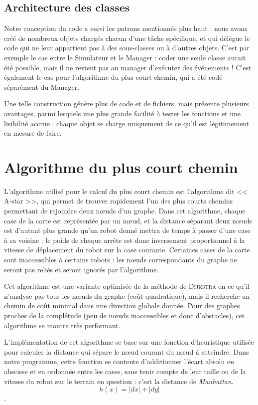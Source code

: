 \documentclass[a4paper,11pt]{article}
\begin{document}
\subsection{Architecture des classes}
Notre conception du code a suivi les patrons mentionnés plus haut : nous avons créé de nombreux objets chargés chacun d'une tâche spécifique, et qui délègue le code qui ne leur appartient pas à des sous-classes ou à d'autres objets. C'est par exemple le cas entre le Simulateur et le Manager : coder une seule classe aurait été possible, mais il ne revient pas au manager d'exécuter des événements ! C'est également le cas pour l'algorithme du plus court chemin, qui a été codé séparément du Manager.

Une telle construction génère plus de code et de fichiers, mais présente plusieurs avantages, parmi lesquels une plus grande facilité à tester les fonctions et une lisibilité accrue : chaque objet se charge uniquement de ce qu'il est légitimement en mesure de faire.

\section{Algorithme du plus court chemin}
L'algorithme utilisé pour le calcul du plus court chemin est l'algorithme dit << A-star >>, qui permet de trouver rapidement l'un des plus courts chemins permettant de rejoindre deux n\oe uds d'un graphe. Dans cet algorithme, chaque case de la carte est représentée par un n\oe ud, et la distance séparant deux n\oe uds est d'autant plus grande qu'un robot donné mettra de temps à passer d'une case à sa voisine : le poids de chaque arrête est donc inversement proportionnel à la vitesse de déplacement du robot sur la case courante. Certaines cases de la carte sont inaccessibles à certains robots : les n\oe uds correspondants du graphe ne seront pas reliés et seront ignorés par l'algorithme.

\vspace{\baselineskip}
Cet algorithme est une variante optimisée de la méthode de \textsc{Dijkstra} en ce qu'il n'analyse pas tous les n\oe uds du graphe (coût quadratique), mais il recherche un chemin de coût minimal dans une direction globale donnée. Pour des graphes proches de la complétude (peu de n\oe uds inaccessibles et donc d'obstacles), cet algorithme se montre très performant.

\vspace{\baselineskip}
L'implémentation de cet algorithme se base sur une fonction d'heuristique utilisée pour calculer la distance qui sépare le n\oe ud courant du n\oe ud à atteindre. Dans notre programme, cette fonction se contente d'additionner l'écart absolu en abscisse et en ordonnée entre les cases, sans tenir compte de leur taille ou de la vitesse du robot sur le terrain en question : c'est la distance de \emph{Manhattan}.
\[h(x) = |dx|+|dy|\].
\end{document}
